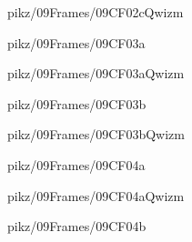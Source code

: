 \documentclass[9pt,xcolor={svgnames, x11names}]{beamer}
\begin{document}

\begin{frame}{pikz/09Frames/09CF02cQwizm}
	
\end{frame}


\begin{frame}{pikz/09Frames/09CF03a}
	
\end{frame}


\begin{frame}{pikz/09Frames/09CF03aQwizm}
	
\end{frame}


\begin{frame}{pikz/09Frames/09CF03b}
	
\end{frame}


\begin{frame}{pikz/09Frames/09CF03bQwizm}
	
\end{frame}


\begin{frame}{pikz/09Frames/09CF04a}
	
\end{frame}


\begin{frame}{pikz/09Frames/09CF04aQwizm}
	
\end{frame}


\begin{frame}{pikz/09Frames/09CF04b}
	
\end{frame}
\end{document}
